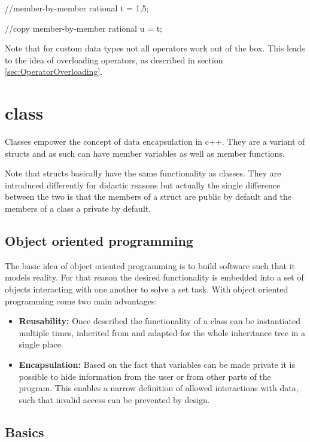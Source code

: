 \documentclass[10pt,a4paper]{scrartcl}
\begin{document}
\begin{multicols*}{2}
\begin{TPCpp}
//member-by-member
rational t = {1,5};

//copy member-by-member
rational u = t; 
\end{TPCpp}

Note that for custom data types not all operators work out of the box. This leads to the idea of overloading operators, as described in section \ref{sec:OperatorOverloading}.

\section{class}

Classes empower the concept of data encapsulation in c++. They are a variant of structs and as such can have member variables as well as member functions. 

\vspace{3ex}

Note that structs basically have the same functionality as classes. They are introduced differently for didactic reasons but actually the single difference between the two is that the members of a struct are public by default and the members of a class a private by default.

\subsection{Object oriented programming}

The basic idea of object oriented programming is to build software such that it models reality. For that reason the desired functionality is embedded into a set of objects interacting with one another to solve a set task. With object oriented programming come two main advantages:

\begin{itemize}
\item \textbf{Reusability:} Once described the functionality of a class can be instantiated multiple times, inherited from and adapted for the whole inheritance tree in a single place.
\item \textbf{Encapsulation:} Based on the fact that variables can be made private it is possible to hide information from the user or from other parts of the program. This enables a narrow definition of allowed interactions with data, such that invalid access can be prevented by design.
\end{itemize}

\subsection{Basics}


\end{multicols*}
\end{document}
